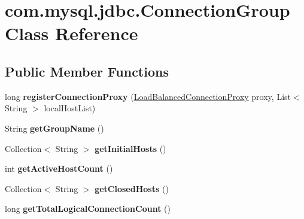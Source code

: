 \hypertarget{classcom_1_1mysql_1_1jdbc_1_1_connection_group}{}\section{com.\+mysql.\+jdbc.\+Connection\+Group Class Reference}
\label{classcom_1_1mysql_1_1jdbc_1_1_connection_group}
\subsection*{Public Member Functions}
\begin{DoxyCompactItemize}
\item 
\mbox{\label{classcom_1_1mysql_1_1jdbc_1_1_connection_group_a0b9bbcb97df0c64dad23edf84c030a8c}} 
long {\bfseries register\+Connection\+Proxy} (\mbox{\hyperlink{classcom_1_1mysql_1_1jdbc_1_1_load_balanced_connection_proxy}{Load\+Balanced\+Connection\+Proxy}} proxy, List$<$ String $>$ local\+Host\+List)
\item 
\mbox{\label{classcom_1_1mysql_1_1jdbc_1_1_connection_group_a8b1b75467cdb903023cffc60362cafe5}} 
String {\bfseries get\+Group\+Name} ()
\item 
\mbox{\label{classcom_1_1mysql_1_1jdbc_1_1_connection_group_aa07cd4fdcafcd821da23f55611021f13}} 
Collection$<$ String $>$ {\bfseries get\+Initial\+Hosts} ()
\item 
\mbox{\label{classcom_1_1mysql_1_1jdbc_1_1_connection_group_a00a7049f7312d5710f282d51c62cea0e}} 
int {\bfseries get\+Active\+Host\+Count} ()
\item 
\mbox{\label{classcom_1_1mysql_1_1jdbc_1_1_connection_group_a80fba5dc8d17b4a9f183158f630bd769}} 
Collection$<$ String $>$ {\bfseries get\+Closed\+Hosts} ()
\item 
\mbox{\label{classcom_1_1mysql_1_1jdbc_1_1_connection_group_a249146837505ecacf02fd287343f2316}} 
long {\bfseries get\+Total\+Logical\+Connection\+Count} ()
\item 

\end{DoxyCompactItemize}

